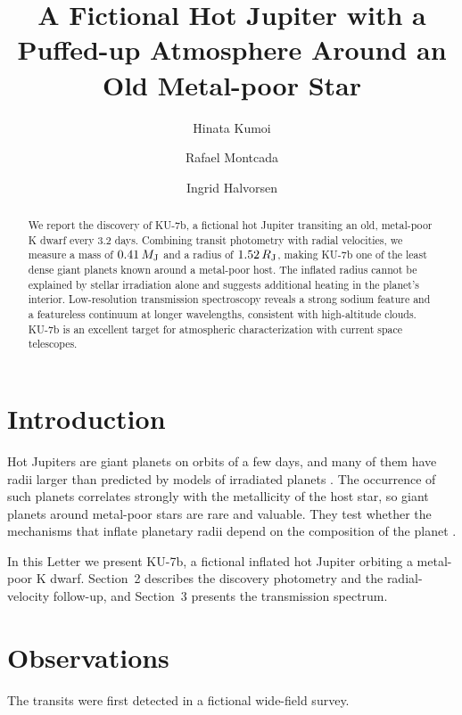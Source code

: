 \documentclass[twocolumn]{aastex701}
\begin{document}
\title{A Fictional Hot Jupiter with a Puffed-up Atmosphere Around an Old Metal-poor Star}
\author[orcid=0000-0000-0000-0001]{Hinata Kumoi}
\author{Rafael Montcada}
\author{Ingrid Halvorsen}
\begin{abstract}
We report the discovery of KU-7b, a fictional hot Jupiter transiting an old, metal-poor K dwarf every 3.2 days.
Combining transit photometry with radial velocities, we measure a mass of $0.41\,M_{\rm J}$ and a radius of $1.52\,R_{\rm J}$, making KU-7b one of the least dense giant planets known around a metal-poor host.
The inflated radius cannot be explained by stellar irradiation alone and suggests additional heating in the planet's interior.
Low-resolution transmission spectroscopy reveals a strong sodium feature and a featureless continuum at longer wavelengths, consistent with high-altitude clouds.
KU-7b is an excellent target for atmospheric characterization with current space telescopes.
\end{abstract}
\section{Introduction}
Hot Jupiters are giant planets on orbits of a few days, and many of them have radii larger than predicted by models of irradiated planets \citep{kumoi2021,montcada2022}.
The occurrence of such planets correlates strongly with the metallicity of the host star, so giant planets around metal-poor stars are rare and valuable.
They test whether the mechanisms that inflate planetary radii depend on the composition of the planet \citep{halvorsen2023}.

In this Letter we present KU-7b, a fictional inflated hot Jupiter orbiting a metal-poor K dwarf.
Section~2 describes the discovery photometry and the radial-velocity follow-up, and Section~3 presents the transmission spectrum.

\section{Observations}
The transits were first detected in a fictional wide-field survey.
{}

\end{document}
